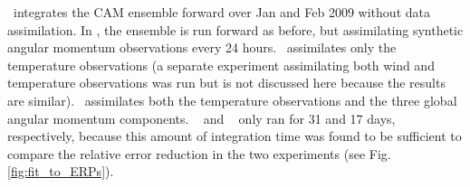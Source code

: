 \NODA ~integrates the CAM ensemble forward over Jan and Feb 2009 without data assimilation. 
In \ERPALL, the ensemble is run forward as before, but assimilating synthetic angular momentum observations every 24 hours.
\RST ~assimilates only the temperature observations (a separate experiment assimilating both wind and temperature observations was run but is not discussed here because the results are similar).
\ERPRST ~assimilates both the temperature observations and the three global angular momentum components.
\RST~ and \ERPRST~ only ran for 31 and 17 days, respectively, because this amount of integration time was found to be sufficient to compare the relative error reduction in the two experiments (see Fig. \ref{fig:fit_to_ERPs}). 
